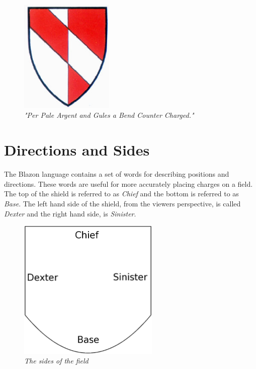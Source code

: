 \begin{figure}[H]
  \centering
    \includegraphics[width=0.4\textwidth]{Blazon/images/countercharged.eps}
  \caption{\emph{"Per Pale Argent and Gules a Bend Counter Charged."\cite{countercharge}}}
  \label{fig:counter}
  
\end{figure}

\section{Directions and Sides}
The Blazon language contains a set of words for describing positions and directions.  These words are useful for more accurately placing charges on a field.  The top of the shield is referred to as \emph{Chief} and the bottom is referred to as \emph{Base}.  The left hand side of the shield, from the viewers perspective, is called \emph{Dexter} and the right hand side, is \emph{Sinister}. 

\begin{figure}[H]
  \centering
    \includegraphics[width=0.6\textwidth]{Blazon/images/sides.eps}
  \caption{\emph{The sides of the field}}
  
\end{figure}

